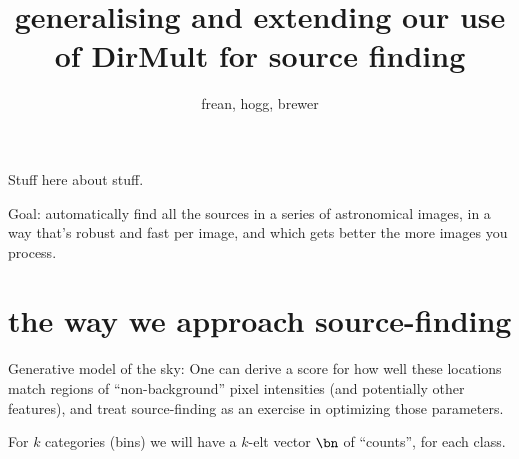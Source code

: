 \documentclass[12pt]{article}
\title{generalising and extending our use of DirMult for source finding}
\author{frean, hogg, brewer}
\date{}
\begin{document}
\sloppy\sloppypar
\maketitle

Stuff here about stuff.

Goal: automatically find all the sources in a series of astronomical images, in
a way that's robust and fast per image, and which gets better the more images you process.

\section{the way we approach source-finding}

Generative model of the sky:
One can derive a score for
how well these locations match regions of ``non-background'' pixel
intensities (and potentially other features), and treat source-finding
as an exercise in optimizing those parameters.

For $k$ categories (bins) we will have a $k$-elt vector $\bn$ of
``counts'', for each class.  
\end{document}

